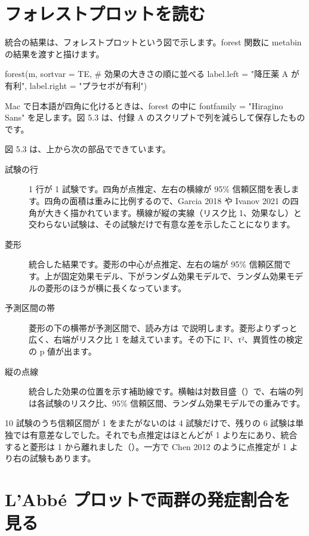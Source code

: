 \section{フォレストプロットを読む}
\label{sec:05-8}

統合の結果は、フォレストプロットという図で示します。forest 関数に metabin の結果を渡すと描けます。

\begin{rcode}
forest(m, sortvar = TE,     # 効果の大きさの順に並べる
       label.left  = "降圧薬 A が有利",
       label.right = "プラセボが有利")
\end{rcode}

Mac で日本語が四角に化けるときは、forest の中に fontfamily = "Hiragino Sans" を足します。図 5.3 は、付録 A のスクリプトで列を減らして保存したものです。


図 5.3 は、上から次の部品でできています。

\begin{description}
\item[試験の行] 1 行が 1 試験です。四角が点推定、左右の横線が 95\% 信頼区間を表します。四角の面積は重みに比例するので、Garcia 2018 や Ivanov 2021 の四角が大きく描かれています。横線が縦の実線（リスク比 1、効果なし）と交わらない試験は、その試験だけで有意な差を示したことになります。
\item[菱形] 統合した結果です。菱形の中心が点推定、左右の端が 95\% 信頼区間です。上が固定効果モデル、下がランダム効果モデルで、ランダム効果モデルの菱形のほうが横に長くなっています。
\item[予測区間の帯] 菱形の下の横帯が予測区間で、読み方は  で説明します。菱形よりずっと広く、右端がリスク比 1 を越えています。その下に I²、τ²、異質性の検定の p 値が出ます。
\item[縦の点線] 統合した効果の位置を示す補助線です。横軸は対数目盛（）で、右端の列は各試験のリスク比、95\% 信頼区間、ランダム効果モデルでの重みです。
\end{description}

10 試験のうち信頼区間が 1 をまたがないのは 4 試験だけで、残りの 6 試験は単独では有意差なしでした。それでも点推定はほとんどが 1 より左にあり、統合すると菱形は 1 から離れました（）。一方で Chen 2012 のように点推定が 1 より右の試験もあります。

\section{\hatten L'Abbé プロットで両群の発症割合を見る}
\label{sec:05-9}

